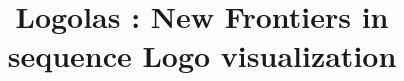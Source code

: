 \documentclass{bmcart}
\begin{document}
\begin{frontmatter}

\begin{fmbox}


\title{Logolas : New Frontiers in sequence Logo visualization}


\author[
   addressref={aff1},                   %
   corref={aff1},                       %
   email={kkdey@uchicago.edu}   %
]{ }
\author[
   addressref={aff1},
   email={dyxie@uchicago.edu}
]{ }
\author[
   addressref={aff1, aff2},
   email={mstephens@uchicago.edu}
]{ }


\address[id=aff1]{%
  , %
  ,%
  ,                              %
}
\address[id=aff2]{%
  ,
  ,
  ,
}


\end{fmbox}
\end{frontmatter}
\end{document}
